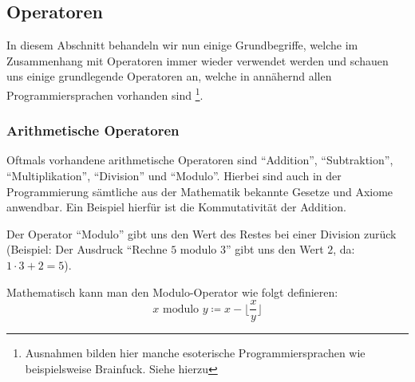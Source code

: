 \subsection{Operatoren} \functionalMark \imperativeMark \oopMark
	
	In diesem Abschnitt behandeln wir nun einige Grundbegriffe, welche im Zusammenhang mit Operatoren immer wieder verwendet werden und schauen uns einige grundlegende Operatoren an, welche in annähernd allen Programmiersprachen vorhanden sind \footnote{Ausnahmen bilden hier manche esoterische Programmiersprachen wie beispielsweise Brainfuck. Siehe hierzu }.
	
	\subsubsection{Arithmetische Operatoren}
		Oftmals vorhandene arithmetische Operatoren sind \enquote{Addition}, \enquote{Subtraktion}, \enquote{Multiplikation}, \enquote{Division} und \enquote{Modulo}. Hierbei sind auch in der Programmierung sämtliche aus der Mathematik bekannte Gesetze und Axiome anwendbar. Ein Beispiel hierfür ist die Kommutativität der Addition.
		
		Der Operator \enquote{Modulo} gibt uns den Wert des Restes bei einer Division zurück (Beispiel: Der Ausdruck \enquote{Rechne $ 5 $ modulo $ 3 $} gibt uns den Wert $ 2 $, da: $ 1 \cdot 3 + 2 = 5 $).
		
		Mathematisch kann man den Modulo-Operator wie folgt definieren:
		\begin{equation*}
			x \text{ modulo } y \coloneqq x - \bigg\lfloor \frac{x}{y} \bigg\rfloor
		\end{equation*}
	
